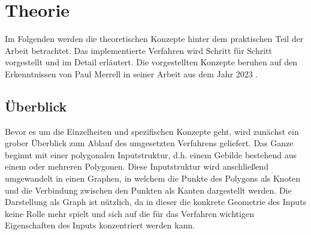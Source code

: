 %
\chapter{Theorie}
Im Folgenden werden die theoretischen Konzepte hinter dem praktischen Teil der Arbeit betrachtet. Das implementierte Verfahren wird
Schritt für Schritt vorgestellt und im Detail erläutert. Die vorgestellten Konzepte beruhen auf den Erkenntnissen von Paul Merrell
in seiner Arbeit aus dem Jahr 2023 \cite{1_merrell}.


\section{Überblick}

Bevor es um die Einzelheiten und spezifischen Konzepte geht, wird zunächst ein grober Überblick zum Ablauf des umgesetzten
Verfahrens geliefert. Das Ganze beginnt mit einer polygonalen Inputstruktur, d.h. einem Gebilde bestehend aus einem oder mehreren Polygonen.
Diese Inputstruktur wird anschließend umgewandelt in einen Graphen, in welchem die Punkte des Polygons als Knoten und die Verbindung zwischen
den Punkten als Kanten dargestellt werden. Die Darstellung als Graph ist nützlich, da in dieser die konkrete Geometrie des Inputs keine Rolle
mehr spielt und sich auf die für das Verfahren wichtigen Eigenschaften des Inputs konzentriert werden kann.


